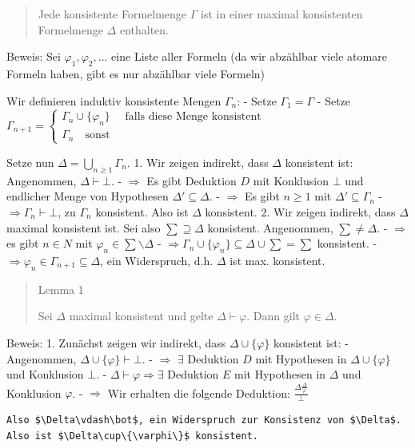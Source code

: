 \documentclass[a4paper]{article}
\begin{document}
\begin{multicols}{3}
\begin{quote}
    Jede konsistente Formelmenge $\Gamma$ ist in einer maximal konsistenten
    Formelmenge $\Delta$ enthalten.
  \end{quote}

  Beweis: Sei $\varphi_1,\varphi_2,...$ eine Liste aller Formeln (da wir
  abzählbar viele atomare Formeln haben, gibt es nur abzählbar viele
  Formeln)

  Wir definieren induktiv konsistente Mengen $\Gamma_n$: - Setze
  $\Gamma_1 = \Gamma$ - Setze
  $\Gamma_{n+1}= \begin{cases} \Gamma_n\cup\{\varphi_n\}\quad\text{ falls diese Menge konsistent} \\ \Gamma_n \quad\text{sonst}\end{cases}$

  Setze nun $\Delta =\bigcup_{n\geq 1} \Gamma_n$. 1. Wir zeigen indirekt,
  dass $\Delta$ konsistent ist: Angenommen, $\Delta\vdash\bot$. -
  $\Rightarrow$ Es gibt Deduktion $D$ mit Konklusion $\bot$ und endlicher
  Menge von Hypothesen $\Delta'\subseteq\Delta$. - $\Rightarrow$ Es gibt
  $n\geq 1$ mit $\Delta'\subseteq\Gamma_n$ -
  $\Rightarrow \Gamma_n\vdash\bot$, zu $\Gamma_n$ konsistent. Also ist
  $\Delta$ konsistent. 2. Wir zeigen indirekt, dass $\Delta$ maximal
  konsistent ist. Sei also $\sum\supseteq\Delta$ konsistent. Angenommen,
  $\sum\not=\Delta$. - $\Rightarrow$ es gibt $n\in N$ mit
  $\varphi_n\in\sum\backslash\Delta$ -
  $\Rightarrow \Gamma_n\cup\{\varphi_n\}\subseteq\Delta\cup\sum= \sum$
  konsistent. - $\Rightarrow \varphi_n \in\Gamma_{n+1}\subseteq \Delta$,
  ein Widerspruch, d.h. $\Delta$ ist max. konsistent.

  \begin{quote}
    Lemma 1

    Sei $\Delta$ maximal konsistent und gelte $\Delta\vdash\varphi$. Dann
    gilt $\varphi\in\Delta$.
  \end{quote}

  Beweis: 1. Zunächst zeigen wir indirekt, dass $\Delta\cup\{\varphi\}$
  konsistent ist: - Angenommen, $\Delta\cup\{\varphi\}\vdash\bot$. -
  $\Rightarrow$ $\exists$ Deduktion $D$ mit Hypothesen in
  $\Delta\cup\{\varphi\}$ und Konklusion $\bot$. -
  $\Delta\vdash \varphi \Rightarrow \exists$ Deduktion $E$ mit Hypothesen
  in $\Delta$ und Konklusion $\varphi$. - $\Rightarrow$ Wir erhalten die
  folgende Deduktion: $\frac{\Delta \frac{\Delta}{\varphi}}{\bot}$

  \begin{verbatim}
Also $\Delta\vdash\bot$, ein Widerspruch zur Konsistenz von $\Delta$. Also ist $\Delta\cup\{\varphi\}$ konsistent.
\end{verbatim}


\end{multicols}
\end{document}

